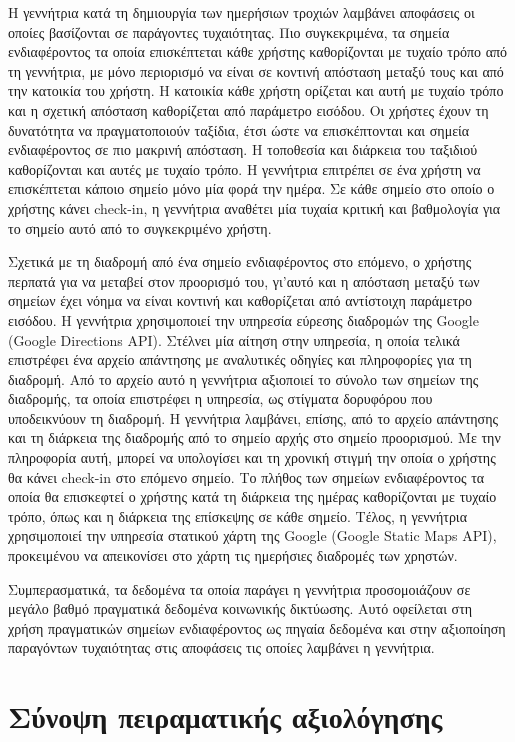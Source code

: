 Η γεννήτρια κατά τη δημιουργία των ημερήσιων τροχιών λαμβάνει αποφάσεις οι οποίες βασίζονται σε παράγοντες τυχαιότητας. Πιο συγκεκριμένα, τα σημεία 
ενδιαφέροντος τα οποία επισκέπτεται κάθε χρήστης καθορίζονται με τυχαίο τρόπο από τη γεννήτρια, με μόνο περιορισμό να είναι σε κοντινή απόσταση μεταξύ τους και από 
την κατοικία του χρήστη. Η κατοικία κάθε χρήστη ορίζεται και αυτή με τυχαίο τρόπο και η σχετική απόσταση καθορίζεται από παράμετρο εισόδου. Οι χρήστες έχουν 
τη δυνατότητα να πραγματοποιούν ταξίδια, έτσι ώστε να επισκέπτονται και σημεία ενδιαφέροντος σε πιο μακρινή απόσταση. Η τοποθεσία και διάρκεια του ταξιδιού 
καθορίζονται και αυτές με τυχαίο τρόπο. Η γεννήτρια επιτρέπει σε ένα χρήστη να επισκέπτεται κάποιο σημείο μόνο μία φορά την ημέρα. Σε κάθε σημείο στο οποίο 
ο χρήστης κάνει check-in, η γεννήτρια αναθέτει μία τυχαία κριτική και βαθμολογία για το σημείο αυτό από το συγκεκριμένο χρήστη. 

Σχετικά με τη διαδρομή από ένα σημείο 
ενδιαφέροντος στο επόμενο, ο χρήστης περπατά για να μεταβεί στον προορισμό του, γι'αυτό και η απόσταση μεταξύ των σημείων έχει νόημα να είναι κοντινή και 
καθορίζεται από αντίστοιχη παράμετρο εισόδου. Η γεννήτρια χρησιμοποιεί την υπηρεσία εύρεσης διαδρομών της Google (Google Directions API). 
Στέλνει μία αίτηση στην υπηρεσία, 
η οποία τελικά επιστρέφει ένα αρχείο απάντησης με αναλυτικές οδηγίες και πληροφορίες για τη διαδρομή. Από το αρχείο αυτό η γεννήτρια αξιοποιεί το σύνολο των σημείων της 
διαδρομής, τα οποία επιστρέφει η υπηρεσία, ως στίγματα δορυφόρου που υποδεικνύουν τη διαδρομή. Η γεννήτρια λαμβάνει, επίσης, από το αρχείο απάντησης και τη διάρκεια 
της διαδρομής από το σημείο αρχής στο σημείο προορισμού. Με την πληροφορία αυτή, μπορεί να υπολογίσει και τη χρονική στιγμή την οποία ο χρήστης θα κάνει check-in στο 
επόμενο σημείο. Το πλήθος των σημείων ενδιαφέροντος τα οποία θα επισκεφτεί ο χρήστης κατά τη διάρκεια της ημέρας καθορίζονται με τυχαίο τρόπο, όπως και 
η διάρκεια της επίσκεψης σε κάθε σημείο. Τέλος, η γεννήτρια χρησιμοποιεί την υπηρεσία στατικού χάρτη της Google (Google Static Maps API), προκειμένου να 
απεικονίσει στο χάρτη τις ημερήσιες διαδρομές των χρηστών. 

Συμπερασματικά, τα δεδομένα τα οποία παράγει η γεννήτρια προσομοιάζουν σε μεγάλο βαθμό πραγματικά δεδομένα κοινωνικής δικτύωσης. Αυτό οφείλεται 
στη χρήση πραγματικών σημείων ενδιαφέροντος ως πηγαία δεδομένα και στην αξιοποίηση παραγόντων τυχαιότητας στις αποφάσεις τις οποίες λαμβάνει η γεννήτρια. 


\section{Σύνοψη πειραματικής αξιολόγησης}










